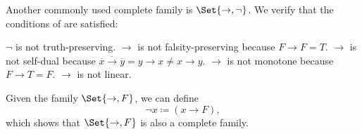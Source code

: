 \begin{example}
\begin{ExEnum}
     Another commonly used complete family is \( \Set{ \to, \neg } \).
    We verify that the conditions of  are satisfied:
    \begin{RefList}
       \( \neg \) is not truth-preserving.
       \( \to \) is not falsity-preserving because \( F \to F = T \).
       \( \to \) is not self-dual because \( \overline{\overline{x} \to \overline{y}} = y \to x \neq x \to y \).
       \( \to \) is not monotone because \( F \to T = F \).
       \( \to \) is not linear.
    \end{RefList}

     Given the family \( \Set{ \to, F } \), we can define
    \begin{equation}
      \neg x \coloneqq (x \to F),
    \end{equation}
    which shows that \( \Set{ \to, F } \) is also a complete family.
  \end{ExEnum}
\end{example}
